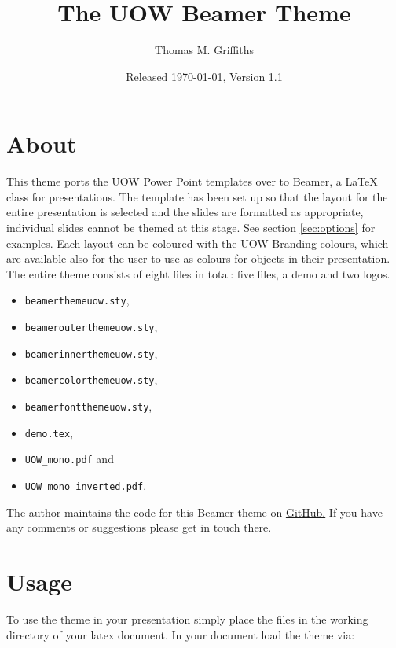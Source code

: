 \documentclass[a4paper,oneside,11pt]{article}
\title{\textsf{The UOW Beamer Theme}}
\author{Thomas M. Griffiths}
\date{Released \today, Version 1.1}
\begin{document}
\maketitle

\section{About}
This theme ports the UOW Power Point templates over to Beamer, a \LaTeX{} class for presentations. The template has been set up so that the layout for the entire presentation is selected and the slides are formatted as appropriate, individual slides cannot be themed at this stage. See section \ref{sec:options} for examples. Each layout can be coloured with the UOW Branding colours, which are available also for the user to use as colours for objects in their presentation. The entire theme consists of eight files in total: five files, a demo and two logos. 
\begin{multicols}{2}
\begin{itemize}
   \item \texttt{\colorbox{UOWgrey!20}{beamerthemeuow.sty}},
   \item \texttt{\colorbox{UOWgrey!20}{beamerouterthemeuow.sty}},
   \item \texttt{\colorbox{UOWgrey!20}{beamerinnerthemeuow.sty}},
   \item \texttt{\colorbox{UOWgrey!20}{beamercolorthemeuow.sty}},
   \item \texttt{\colorbox{UOWgrey!20}{beamerfontthemeuow.sty}},
   \item \texttt{\colorbox{UOWgrey!20}{demo.tex}},
   \item \texttt{\colorbox{UOWgrey!20}{UOW\_mono.pdf}} and
   \item \texttt{\colorbox{UOWgrey!20}{UOW\_mono\_inverted.pdf}}.
\end{itemize}
\end{multicols}

The author maintains the code for this Beamer theme on \href{https://github.com/tmgriffiths/UOW_Beamer}{GitHub.} If you have any comments or suggestions please get in touch there.

\section{Usage}
To use the theme in your presentation simply place the files in the working directory of your latex document. In your document load the theme via:\\
\end{document}
